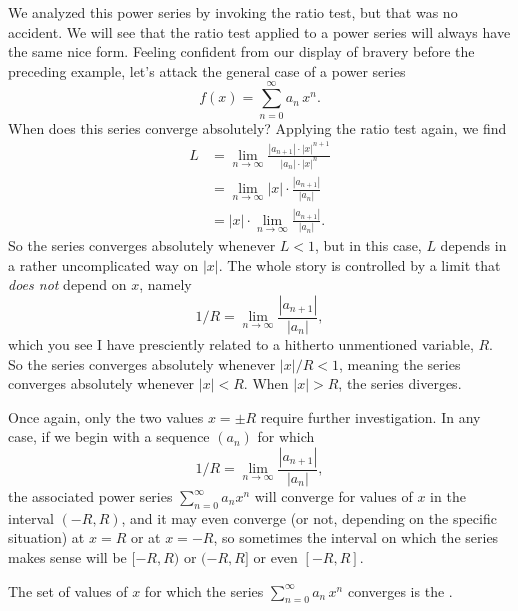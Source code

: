 We analyzed this power series by invoking the ratio test, but that was no
accident.  We will see that the ratio test applied to a power series
will always have the same nice form.  Feeling confident from our
display of bravery before the preceding example, let's attack the
general case of a power series
$$
f(x) = \sum_{n=0}^\infty a_n\, x^n.
$$
When does this series converge absolutely?  Applying the ratio test again, we find
\begin{align*}
  L &= \lim_{n\to\infty} \frac{|a_{n+1}| \cdot |x|^{n+1}}{|a_n| \cdot |x|^{n}} \\
  &= \lim_{n\to\infty} |x| \cdot \frac{|a_{n+1}|}{|a_n|} \\
  &= |x| \cdot \lim_{n\to\infty} \frac{|a_{n+1}|}{|a_n|}.
\end{align*}
So the series converges absolutely whenever $L < 1$, but in this case, $L$ depends in a rather uncomplicated way on $|x|$.  The whole story is controlled by a limit that \textit{does not} depend on $x$, namely
$$
  1/R = \lim_{n\to\infty} \frac{|a_{n+1}|}{|a_n|},
$$
which you see I have presciently related to a hitherto unmentioned
variable, $R$.  So the series converges absolutely whenever $|x| / R <
1$, meaning the series converges absolutely whenever $|x| < R$.  When
$|x| > R$, the series diverges.

Once again, only the two values $x=\pm R$ require further
investigation.  In any case, if we begin with a sequence $(a_n)$ for which
$$
  1/R = \lim_{n\to\infty} \frac{|a_{n+1}|}{|a_n|},
$$
the associated power series $\sum_{n=0}^\infty a_n x^n$ will converge
for values of $x$ in the interval $(-R,R)$, and it may even converge
(or not, depending on the specific situation) at $x = R$ or at $x =
-R$, so sometimes the interval on which the series makes sense will be
$[-R,R)$ or $(-R,R]$ or even $[-R,R]$.

\begin{definition}
  \label{definition:interval-of-convergence}
  The set of values of $x$ for which the series $\sum_{n=0}^\infty a_n \, x^n$ converges is the
  .
\end{definition}

